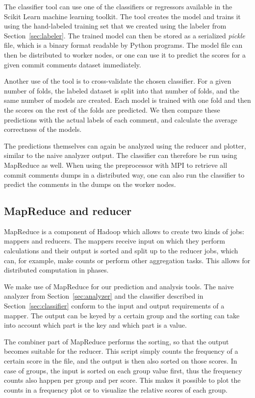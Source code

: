 \documentclass{article}
\begin{document}
The classifier tool can use one of the classifiers or regressors available in
the Scikit Learn machine learning toolkit. The tool creates the model and 
trains it using the hand-labeled training set that we created using the labeler
from Section~\ref{sec:labeler}. The trained model can then be stored as a
serialized \emph{pickle} file, which is a binary format readable by Python
programs. The model file can then be distributed to worker nodes, or one can
use it to predict the scores for a given commit comments dataset immediately.

Another use of the tool is to cross-validate the chosen classifier. For a given 
number of folds, the labeled dataset is split into that number of folds, and 
the same number of models are created. Each model is trained with one fold and 
then the scores on the rest of the folds are predicted. We then compare these 
predictions with the actual labels of each comment, and calculate the average 
correctness of the models.

The predictions themselves can again be analyzed using the reducer and plotter, 
similar to the naive analyzer output. The classifier can therefore be run using 
MapReduce as well. When using the preprocessor with MPI to retrieve all commit 
comments dumps in a distributed way, one can also run the classifier to predict
the comments in the dumps on the worker nodes.

\subsection{MapReduce and reducer}\label{sec:reducer}
MapReduce is a component of Hadoop which allows to create two kinds of jobs: 
mappers and reducers. The mappers receive input on which they perform 
calculations and their output is sorted and split up to the reducer jobs, 
which can, for example, make counts or perform other aggregation tasks. This 
allows for distributed computation in phases.

We make use of MapReduce for our prediction and analysis tools. The naive 
analyzer from Section~\ref{sec:analyzer} and the classifier described in 
Section~\ref{sec:classifier} conform to the input and output requirements of 
a mapper. The output can be keyed by a certain group and the sorting can take 
into account which part is the key and which part is a value.

The combiner part of MapReduce performs the sorting, so that the output becomes 
suitable for the reducer. This script simply counts the frequency of a certain 
score in the file, and the output is then also sorted on those scores. In case 
of groups, the input is sorted on each group value first, thus the frequency
counts also happen per group and per score. This makes it possible to plot the
counts in a frequency plot or to visualize the relative scores of each group.
\end{document}
